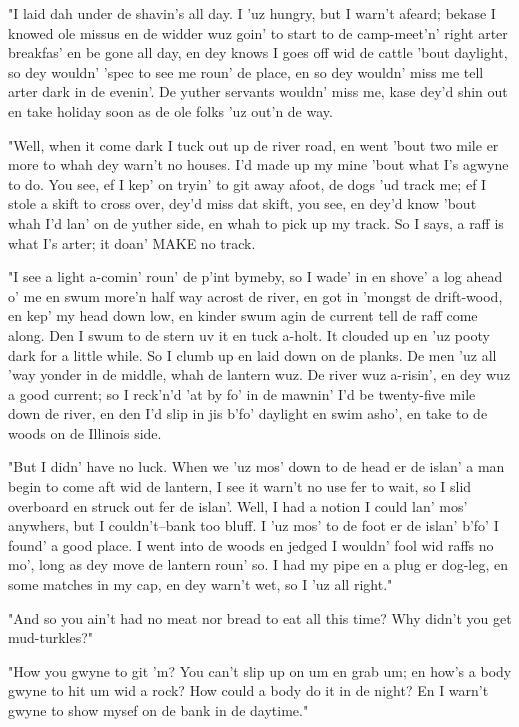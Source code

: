 "I laid dah under de shavin's all day.  I 'uz hungry, but I warn't
afeard; bekase I knowed ole missus en de widder wuz goin' to start to de
camp-meet'n' right arter breakfas' en be gone all day, en dey knows I
goes off wid de cattle 'bout daylight, so dey wouldn' 'spec to see me
roun' de place, en so dey wouldn' miss me tell arter dark in de evenin'.
De yuther servants wouldn' miss me, kase dey'd shin out en take holiday
soon as de ole folks 'uz out'n de way.

"Well, when it come dark I tuck out up de river road, en went 'bout two
mile er more to whah dey warn't no houses.  I'd made up my mine 'bout
what I's agwyne to do.  You see, ef I kep' on tryin' to git away afoot,
de dogs 'ud track me; ef I stole a skift to cross over, dey'd miss dat
skift, you see, en dey'd know 'bout whah I'd lan' on de yuther side, en
whah to pick up my track.  So I says, a raff is what I's arter; it doan'
MAKE no track.

"I see a light a-comin' roun' de p'int bymeby, so I wade' in en shove' a
log ahead o' me en swum more'n half way acrost de river, en got in
'mongst de drift-wood, en kep' my head down low, en kinder swum agin de
current tell de raff come along.  Den I swum to de stern uv it en tuck
a-holt.  It clouded up en 'uz pooty dark for a little while.  So I clumb
up en laid down on de planks.  De men 'uz all 'way yonder in de middle,
whah de lantern wuz.  De river wuz a-risin', en dey wuz a good current;
so I reck'n'd 'at by fo' in de mawnin' I'd be twenty-five mile down de
river, en den I'd slip in jis b'fo' daylight en swim asho', en take to
de woods on de Illinois side.

"But I didn' have no luck.  When we 'uz mos' down to de head er de islan'
a man begin to come aft wid de lantern, I see it warn't no use fer to
wait, so I slid overboard en struck out fer de islan'.  Well, I had a
notion I could lan' mos' anywhers, but I couldn't--bank too bluff.  I 'uz
mos' to de foot er de islan' b'fo' I found' a good place.  I went into de
woods en jedged I wouldn' fool wid raffs no mo', long as dey move de
lantern roun' so.  I had my pipe en a plug er dog-leg, en some matches in
my cap, en dey warn't wet, so I 'uz all right."

"And so you ain't had no meat nor bread to eat all this time?  Why didn't
you get mud-turkles?"

"How you gwyne to git 'm?  You can't slip up on um en grab um; en how's a
body gwyne to hit um wid a rock?  How could a body do it in de night?  En
I warn't gwyne to show mysef on de bank in de daytime."

